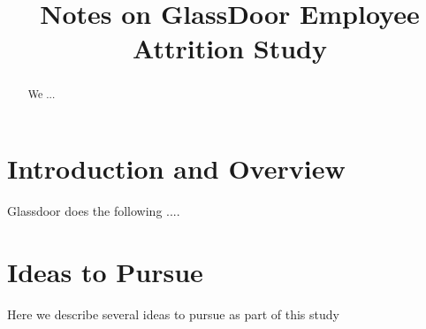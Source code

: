 \documentclass{amsart}[12pt]
\title{Notes on GlassDoor Employee Attrition Study}
\begin{document}
\maketitle

\begin{abstract}
  We ...
\end{abstract}

\section{Introduction and Overview}

Glassdoor does the following ....  

\section{Ideas to Pursue} 

Here we describe several ideas to pursue as part of this study
\end{document}
